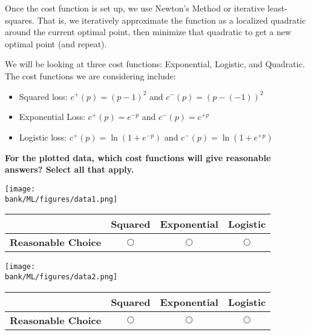 Once the cost function is set up, we use Newton's Method or iterative least-squares. That is, we iteratively approximate the function as a localized quadratic around the current optimal point, then minimize that quadratic to get a new optimal point (and repeat).

We will be looking at three cost functions: Exponential, Logistic, and Quadratic. The cost functions we are considering include:

\begin{itemize}
    \item Squared loss: $c^+(p) = (p-1)^2$ and $c^-(p) = (p - (-1))^2$
    \item Exponential Loss: $c^+(p) = e^{-p}$ and $c^-(p) = c^{+p}$
    \item Logistic loss: $c^+(p) = \ln \left( 1 + e^{-p} \right)$ and $c^-(p) = \ln \left( 1 + e^{+p}\right)$
\end{itemize}

\textbf{For the plotted data, which cost functions will give reasonable answers? Select all that apply.}
\begin{center}
\texttt{[image: \\bank/ML/figures/data1.png]}
\begin{tabular}{| c || c | c | c |}
\hline
& \textbf{Squared} & \textbf{Exponential} & \textbf{Logistic} \\
\hline
\textbf{Reasonable Choice} & $\bigcirc$ & $\bigcirc$ & $\bigcirc$ \\
\hline
\end{tabular}
\end{center}




\begin{center}
\texttt{[image: \\bank/ML/figures/data2.png]}
\begin{tabular}{| c || c | c | c |}
\hline
& \textbf{Squared} & \textbf{Exponential} & \textbf{Logistic} \\
\hline
\textbf{Reasonable Choice} & $\bigcirc$ & $\bigcirc$ & $\bigcirc$ \\
\hline
\end{tabular}
\end{center}

